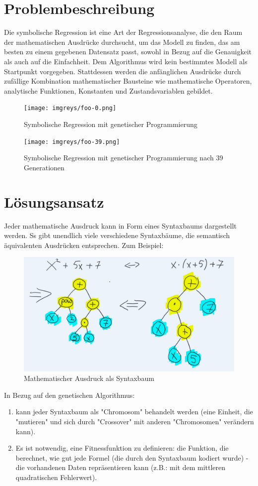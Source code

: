 \documentclass[ngerman]{article}
\begin{document}
	\section{Problembeschreibung}
Die symbolische Regression ist eine Art der Regressionsanalyse, die den Raum der mathematischen Ausdrücke durchsucht, um das Modell zu finden, das am besten zu einem gegebenen Datensatz passt, sowohl in Bezug auf die Genauigkeit als auch auf die Einfachheit. Dem Algorithmus wird kein bestimmtes Modell als Startpunkt vorgegeben. Stattdessen werden die anfänglichen Ausdrücke durch zufällige Kombination mathematischer Bausteine wie mathematische Operatoren, analytische Funktionen, Konstanten und Zustandsvariablen gebildet.

\begin{figure}[h]
	\centering
	\texttt{[image: imgreys/foo-0.png]}
	\caption{Symbolische Regression mit genetischer Programmierung}
	\label{fig::sym}
\end{figure}
\begin{figure}[h]
\centering
\texttt{[image: imgreys/foo-39.png]}
\caption{Symbolische Regression mit genetischer Programmierung nach 39 Generationen}
\label{fig::gen}
\end{figure}
\section{Lösungsansatz}
Jeder mathematische Ausdruck kann in Form eines Syntaxbaums dargestellt werden. Ss gibt unendlich viele verschiedene Syntaxbäume, die semantisch äquivalenten Ausdrücken entsprechen. Zum Beispiel:
\begin{figure}[h]
	 \centering
	\includegraphics[width=0.4\linewidth]{matextree.jpg}
	\caption{Mathematischer Ausdruck als Syntaxbaum}
	\label{fig::matextree}
\end{figure}

In Bezug auf den genetischen Algorithmus:
\begin{enumerate}
	\item  kann jeder Syntaxbaum als "Chromosom" behandelt werden (eine Einheit, die "mutieren" und sich durch "Crossover" mit anderen "Chromosomen" verändern kann).
	\item Es ist notwendig, eine Fitnessfunktion zu definieren: die Funktion, die berechnet, wie gut jede Formel (die durch den Syntaxbaum kodiert wurde) - die vorhandenen Daten repräsentieren kann (z.B.: mit dem mittleren quadratischen Fehlerwert).
\end{enumerate}
\end{document}

